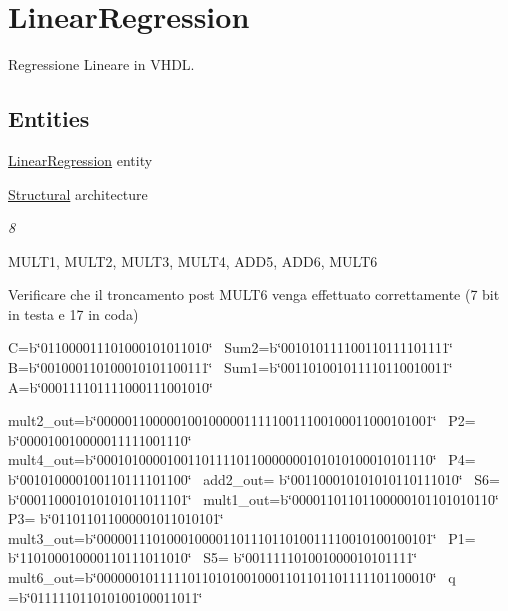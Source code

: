\hypertarget{group___linear_regression}{}\section{Linear\+Regression}
\label{group___linear_regression}


Regressione Lineare in V\+H\+DL.  


\subsection*{Entities}
\begin{DoxyCompactItemize}
\item 
\hyperlink{class_linear_regression}{Linear\+Regression} entity
\item 
\hyperlink{class_linear_regression_1_1_structural}{Structural} architecture
\begin{DoxyCompactList}\small\item\em 8 

M\+U\+L\+T1, M\+U\+L\+T2, M\+U\+L\+T3, M\+U\+L\+T4, A\+D\+D5, A\+D\+D6, M\+U\+L\+T6 

Verificare che il troncamento post M\+U\+L\+T6 venga effettuato correttamente (7 bit in testa e 17 in coda) 

C=b\char`\"{}011000011101000101011010\char`\"{}~\newline
 Sum2=b\char`\"{}001010111100110111101111\char`\"{}~\newline
 B=b\char`\"{}001000110100010101100111\char`\"{}~\newline
 Sum1=b\char`\"{}001101001011110110010011\char`\"{}~\newline
 A=b\char`\"{}000111101111000111001010\char`\"{}  

mult2\+\_\+out=b\char`\"{}000001100000100100000111110011100100011000101001\char`\"{}~\newline
 P2= b\char`\"{}000010010000011111001110\char`\"{}~\newline
 mult4\+\_\+out=b\char`\"{}000101000010011011110110000000101010100010101110\char`\"{}~\newline
 P4= b\char`\"{}001010000100110111101100\char`\"{}~\newline
 add2\+\_\+out= b\char`\"{}001100010101010110111010\char`\"{}~\newline
 S6= b\char`\"{}000110001010101011011101\char`\"{}~\newline
 mult1\+\_\+out=b\char`\"{}00001101101100000101101010110\char`\"{}~\newline
 P3= b\char`\"{}011011011000001011010101\char`\"{}~\newline
 mult3\+\_\+out=b\char`\"{}000001110100010000110111011010011110010100100101\char`\"{}~\newline
 P1= b\char`\"{}110100010000110111011010\char`\"{}~\newline
 S5= b\char`\"{}001111101001000010101111\char`\"{}~\newline
 mult6\+\_\+out=b\char`\"{}000000101111101101010010001101101101111101100010\char`\"{}~\newline
 q =b\char`\"{}011111011010100100011011\char`\"{}  


\end{DoxyCompactList}
\end{DoxyCompactItemize}
